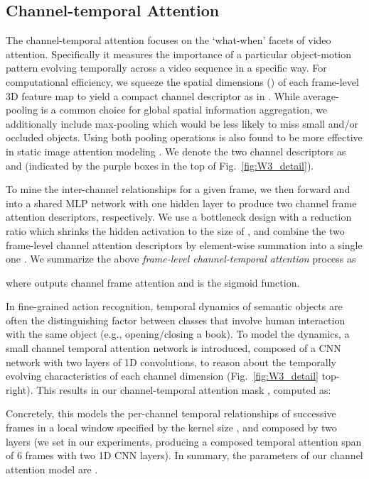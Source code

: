 \documentclass[runningheads]{llncs}
\begin{document}
\subsection{Channel-temporal Attention}
\label{sec:channel_att}
The channel-temporal attention focuses on the `what-when' facets of video attention. Specifically it measures the importance of a particular  object-motion pattern evolving temporally across a video sequence in a specific way. 
For computational efficiency, we squeeze the spatial dimensions () of each frame-level 3D feature map 
to yield a compact channel descriptor 
as in \cite{zeiler2014visualizing,hu2018squeeze}.
While average-pooling is a common choice for global spatial information aggregation,
we additionally include max-pooling which would be less likely to 
miss small and/or occluded objects.
Using both pooling operations is also found to be more effective in static image attention modeling \cite{woo2018cbam}.
We denote the two channel descriptors as 
and  (indicated by the purple boxes in the top of Fig.~\ref{fig:W3_detail}).

To mine the inter-channel relationships for a given frame,
we then forward 
and  into a shared MLP network  with one hidden layer
to produce two channel frame attention descriptors, respectively.
We use a bottleneck design with a reduction ratio 
which shrinks the hidden activation to the size of ,
and combine the two frame-level channel attention descriptors by element-wise summation
into a single one .
We summarize the above {\em frame-level channel-temporal attention} process as

where  outputs channel frame attention
and  is the sigmoid function.

In fine-grained action recognition, temporal dynamics of semantic objects are often the distinguishing factor between classes that involve human interaction with the same object (e.g., opening/closing a book). 
To model the dynamics, a small channel temporal attention network  is introduced, composed of 
a CNN network with two layers of 1D convolutions, to reason about the 
temporally evolving characteristics of each channel dimension (Fig.~\ref{fig:W3_detail} top-right).
This results in our channel-temporal attention mask , computed as:

Concretely, this models the per-channel temporal relationships of successive frames  in a local window specified 
by the kernel size , and composed by two layers (we set  in our experiments, producing a composed temporal attention span of 6 frames with two 1D CNN layers).
In summary, the parameters of our channel attention model are .
\end{document}
